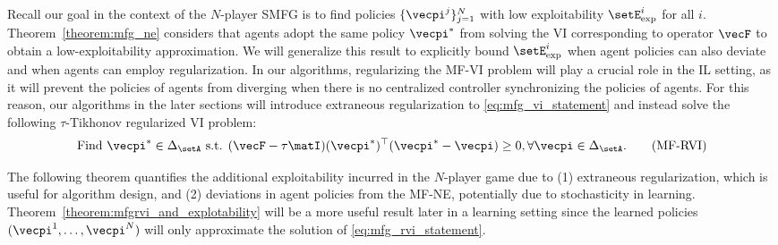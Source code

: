 Recall our goal in the context of the $N$-player SMFG is to find policies $\{\vecpi^j\}_{j=1}^N$ with low exploitability $\setE_{\text{exp}}^i$ for all $i$. Theorem~\ref{theorem:mfg_ne} considers that agents adopt the same policy $\vecpi^*$ from solving the VI corresponding to operator $\vecF$ to obtain a low-exploitability approximation. 
We will generalize this result to explicitly bound $\setE_{\text{exp}}^i$ when agent policies can also deviate and when agents can employ regularization.
In our algorithms, regularizing the MF-VI problem will play a crucial role in the IL setting, as it will prevent the policies of agents from diverging when there is no centralized controller synchronizing the policies of agents.
For this reason, our algorithms in the later sections will introduce extraneous regularization to \eqref{eq:mfg_vi_statement} and instead solve the following $\tau$-Tikhonov regularized VI problem:
\begin{align}\label{eq:mfg_rvi_statement}
    \text{Find } \vecpi^* \in \Delta_\setA \text{ s.t. } (\vecF - \tau \matI)(\vecpi^*)^\top (\vecpi^* - \vecpi) \geq 0, \forall \vecpi\in \Delta_\setA. \tag{MF-RVI}
\end{align}

The following theorem quantifies the additional exploitability incurred in the $N$-player game due to (1) extraneous regularization, which is useful for algorithm design, and (2) deviations in agent policies from the MF-NE, potentially due to stochasticity in learning.
Theorem~\ref{theorem:mfgrvi_and_explotability} will be a more useful result later in a learning setting since the learned policies $(\vecpi^1, \ldots, \vecpi^N)$ will only approximate the solution of \eqref{eq:mfg_rvi_statement}.

